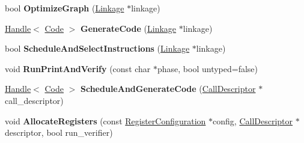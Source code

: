 \begin{DoxyCompactItemize}
\item 
bool {\bfseries Optimize\+Graph} (\hyperlink{classv8_1_1internal_1_1compiler_1_1_linkage}{Linkage} $\ast$linkage)\hypertarget{classv8_1_1internal_1_1compiler_1_1_pipeline_impl_acd1af9ca0ef839d08d7854e80d944b9f}{}\label{classv8_1_1internal_1_1compiler_1_1_pipeline_impl_acd1af9ca0ef839d08d7854e80d944b9f}

\item 
\hyperlink{classv8_1_1internal_1_1_handle}{Handle}$<$ \hyperlink{classv8_1_1internal_1_1_code}{Code} $>$ {\bfseries Generate\+Code} (\hyperlink{classv8_1_1internal_1_1compiler_1_1_linkage}{Linkage} $\ast$linkage)\hypertarget{classv8_1_1internal_1_1compiler_1_1_pipeline_impl_a30113073a095a045199bc26879d157f2}{}\label{classv8_1_1internal_1_1compiler_1_1_pipeline_impl_a30113073a095a045199bc26879d157f2}

\item 
bool {\bfseries Schedule\+And\+Select\+Instructions} (\hyperlink{classv8_1_1internal_1_1compiler_1_1_linkage}{Linkage} $\ast$linkage)\hypertarget{classv8_1_1internal_1_1compiler_1_1_pipeline_impl_a2a3f795701f14dbf755d42cbfe5e603e}{}\label{classv8_1_1internal_1_1compiler_1_1_pipeline_impl_a2a3f795701f14dbf755d42cbfe5e603e}

\item 
void {\bfseries Run\+Print\+And\+Verify} (const char $\ast$phase, bool untyped=false)\hypertarget{classv8_1_1internal_1_1compiler_1_1_pipeline_impl_a5902a52f83068f881b63cd17a20bea5d}{}\label{classv8_1_1internal_1_1compiler_1_1_pipeline_impl_a5902a52f83068f881b63cd17a20bea5d}

\item 
\hyperlink{classv8_1_1internal_1_1_handle}{Handle}$<$ \hyperlink{classv8_1_1internal_1_1_code}{Code} $>$ {\bfseries Schedule\+And\+Generate\+Code} (\hyperlink{classv8_1_1internal_1_1compiler_1_1_call_descriptor}{Call\+Descriptor} $\ast$call\+\_\+descriptor)\hypertarget{classv8_1_1internal_1_1compiler_1_1_pipeline_impl_a64cfc42497a1ded248d3153957e14239}{}\label{classv8_1_1internal_1_1compiler_1_1_pipeline_impl_a64cfc42497a1ded248d3153957e14239}

\item 
void {\bfseries Allocate\+Registers} (const \hyperlink{classv8_1_1internal_1_1_register_configuration}{Register\+Configuration} $\ast$config, \hyperlink{classv8_1_1internal_1_1compiler_1_1_call_descriptor}{Call\+Descriptor} $\ast$descriptor, bool run\+\_\+verifier)\hypertarget{classv8_1_1internal_1_1compiler_1_1_pipeline_impl_aeef65ad624caee0a9f68fef1285fbc31}{}\label{classv8_1_1internal_1_1compiler_1_1_pipeline_impl_aeef65ad624caee0a9f68fef1285fbc31}


\end{DoxyCompactItemize}
